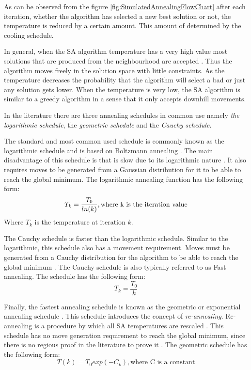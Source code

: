 As can be observed from the figure \ref{fig:SimulatedAnnealingFlowChart} after each iteration, whether the algorithm has selected a new best solution or not, the temperature is reduced by a certain amount. This amount of determined by the cooling schedule.

In general, when the SA algorithm temperature has a very high value most solutions that are produced from the neighbourhood are accepted \cite{ClusterSA}. Thus the algorithm moves freely in the solution space with little constraints. As the temperature decreases the probability that the algorithm will select a bad or just any solution gets lower. When the temperature is very low, the SA algorithm is similar to a greedy algorithm in a sense that it only accepts downhill movements\cite{ClusterSA}.

In the literature there are three annealing schedules in common use namely \emph{the logarithmic schedule}, the \emph{geometric schedule} and the \emph{Cauchy schedule}\cite{VeryFastSAImageEnchancement,SASingleMultiObj}. 

The standard and most common used schedule is commonly known as the logarithmic schedule and is based on Boltzmann annealing \cite{VeryFastSAImageEnchancement}. The main disadvantage of this schedule is that is slow due to its logarithmic nature \cite{VeryFastSAImageEnchancement}. It also requires moves to be generated from a Gaussian distribution for it to be able to reach the global minimum\cite{SASingleMultiObj}. The logarithmic annealing function has the following form:
\begin{equation}
	T_k = \frac{T_0}{ln(k)},\text{where k is the iteration value}\\
\end{equation}
Where $T_k$ is the temperature at iteration $k$.

The Cauchy schedule is faster than the logarithmic schedule. Similar to the logarithmic, this schedule also has a movement requirement. Moves must be generated from a Cauchy distribution for the algorithm to be able to reach the global minimum \cite{SASingleMultiObj,VeryFastSAImageEnchancement}. The Cauchy schedule is also typically referred to as Fast annealing\cite{VeryFastSAImageEnchancement}. The schedule has the following form:
\begin{equation}
	T_k = \frac{T_0}{k}
\end{equation}

Finally, the fastest annealing schedule is known as the geometric or exponential annealing schedule \cite{SASingleMultiObj}. This schedule introduces the concept of \emph{re-annealing}. Re-annealing is a procedure by which all SA temperatures are rescaled \cite{VeryFastSAImageEnchancement}. This schedule has no move generation requirement to reach the global minimum, since there is no regious proof in the literature to prove it \cite{SASingleMultiObj}. The geometric schedule has the following form:
\begin{equation}
	T(k)=T_0exp(-C_k),\text{where C is a constant}
\end{equation}
